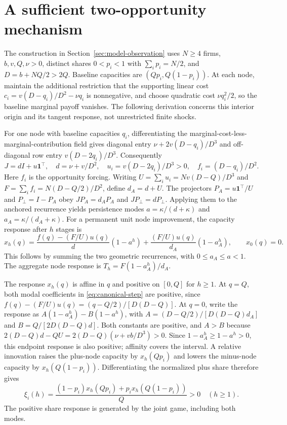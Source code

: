 \section{A sufficient two-opportunity mechanism}\label{app:canonical-mechanism}

The construction in Section~\ref{sec:model-observation} uses $N\geq4$ firms,
$b,v,Q,\nu>0$, distinct shares $0<p_i<1$ with $\sum_i p_i=N/2$, and $D=b+NQ/2>2Q$.
Baseline capacities are $(Qp_i,Q(1-p_i))$.
At each node, maintain the additional restriction that the supporting linear
cost $c_i=v(D-q_i)/D^2-\nu q_i$ is nonnegative, and choose quadratic cost
$\nu q_i^2/2$, so the baseline marginal payoff vanishes.
The following derivation concerns this interior origin and its tangent
response, not unrestricted finite shocks.

For one node with baseline capacities $q_i$, differentiating the
marginal-cost-less-marginal-contribution field gives diagonal entry
$\nu+2v(D-q_i)/D^3$ and off-diagonal row entry $v(D-2q_i)/D^3$.
Consequently
\begin{equation}\label{eq:canonical-jacobian}
  J=dI+u\mathbf1^\top,\quad d=\nu+v/D^2,\quad
  u_i=v(D-2q_i)/D^3>0,\quad f_i=(D-q_i)/D^2.
\end{equation}
Here $f_i$ is the opportunity forcing.
Writing $U=\sum_i u_i=Nv(D-Q)/D^3$ and $F=\sum_i f_i=N(D-Q/2)/D^2$, define $d_A=d+U$.
The projectors $P_A=u\mathbf1^\top/U$ and $P_\perp=I-P_A$ obey $JP_A=d_A P_A$
and $JP_\perp=dP_\perp$.
Applying them to the anchored recurrence yields persistence modes
$a=\kappa/(d+\kappa)$ and $a_A=\kappa/(d_A+\kappa)$.
For a permanent unit node improvement, the capacity response after $h$ stages is
\begin{equation}\label{eq:canonical-step}
  x_h(q)=\frac{f(q)-(F/U)u(q)}{d}(1-a^h)
  +\frac{(F/U)u(q)}{d_A}(1-a_A^h),\qquad x_0(q)=0.
\end{equation}
This follows by summing the two geometric recurrences, with $0\leq a_A\leq a<1$.
The aggregate node response is $T_h=F(1-a_A^h)/d_A$.

The response $x_h(q)$ is affine in $q$ and positive on $[0,Q]$ for $h\geq1$.
At $q=Q$, both modal coefficients in \eqref{eq:canonical-step} are positive, since
$f(q)-(F/U)u(q)=(q-Q/2)/[D(D-Q)]$.
At $q=0$, write the response as
$A(1-a_A^h)-B(1-a^h)$, with
$A=(D-Q/2)/[D(D-Q)d_A]$ and $B=Q/[2D(D-Q)d]$.
Both constants are positive, and $A>B$ because
$2(D-Q)d-QU=2(D-Q)(\nu+vb/D^3)>0$.
Since $1-a_A^h\geq1-a^h>0$, this endpoint response is also positive; affinity
covers the interval.
A relative innovation raises the plus-node capacity by $x_h(Qp_i)$ and lowers
the minus-node capacity by $x_h(Q(1-p_i))$.
Differentiating the normalized plus share therefore gives
\begin{equation}\label{eq:canonical-share-step}
  \xi_i(h)=\frac{(1-p_i)x_h(Qp_i)+p_i x_h(Q(1-p_i))}{Q}>0
  \quad(h\geq1).
\end{equation}
The positive share response is generated by the joint game, including both modes.

